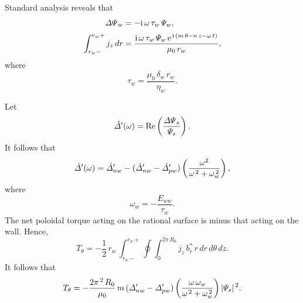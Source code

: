 \documentclass[notitlepage,12pt]{article}
\begin{document}
Standard analysis reveals that 
\begin{align}
{\mit\Delta\Psi}_w &= - {\rm i}\,\omega\,\tau_w\,{\mit\Psi}_w,\\[0.5ex]
\int_{r_w-}^{r_w+} j_z\,dr& = \frac{{\rm i}\,\omega\,\tau_w\,{\mit\Psi}_w\,{\rm e}^{\,{\rm i}\,(m\,\theta-n\,z-\omega\,t)}}{\mu_0\,r_w},
\end{align}
where
\begin{equation}
\tau_w = \frac{\mu_0\,\delta_w\,r_w}{\eta_w}.
\end{equation}

Let
\begin{equation}
\hat{\mit\Delta}'(\omega)= {\rm Re}\left(\frac{{\mit\Delta\Psi}_s}{{\mit\Psi}_s}\right).
\end{equation}
It follows that
\begin{equation}
\hat{\mit\Delta}'(\omega) = \hat{\mit\Delta}'_{nw} - (\hat{\mit\Delta}'_{nw}-\hat{\mit\Delta}'_{pw})\left(\frac{\omega^2}{\omega^{\,2} + \omega_w^{\,2}}\right),
\end{equation}
where
\begin{equation}
\omega_w = -\frac{E_{ww}}{\tau_w}.
\end{equation}
The net poloidal torque acting on the rational surface is minus that acting on the wall. Hence,
\begin{equation}
T_\theta = -\frac{1}{2}\,r_w\,\int_{r_w-}^{r_w+}\oint\int_{0}^{2\pi\,R_0} j_z\, b_r^{\ast}\,r\,dr\,d\theta\,dz.
\end{equation}
It follows that
\begin{equation}
T_\theta =- \frac{2\pi^{\,2}\,R_0}{\mu_0}\,m\,({\mit\Delta}'_{nw}-{\mit\Delta}'_{pw})\left(\frac{\omega\,\omega_w}{\omega^{\,2}+
\omega_w^{\,2}}\right)|{\mit\Psi}_s|^{\,2}.
\end{equation}
\end{document}
